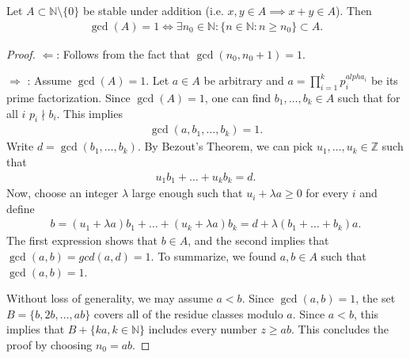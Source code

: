 \begin{lemma}
	Let $A \subset \mathbb{N}\setminus \{0\}$ be stable under addition (i.e. $x,y\in A \implies x+y \in A$). Then
	\begin{align}
		\gcd (A) = 1 \iff \exists n_0 \in \mathbb{N}: \{n \in \mathbb{N}: n \geq n_0 \} \subset A.	
	\end{align}
\end{lemma}
\begin{proof}
	$\Longleftarrow$: Follows from the fact that $\gcd(n_0, n_0+1)=1$.

	$\Longrightarrow$ : Assume $\gcd(A)=1$. Let $a \in A$ be arbitrary and  $a =  \prod_{i=1}^{k}p_{i}^{alpha_i}$ be its prime factorization. Since $\gcd(A)=1$, one can find $b_1, \ldots, b_k \in A$ such that for all $i$ $p_i \nmid b_i$. This implies
	\begin{align}
		\gcd(a,b_1,\ldots, b_k)=1.
	\end{align}
	Write $d=\gcd(b_1,\ldots, b_k)$. By Bezout's Theorem, we can pick $u_1,\ldots,u_k \in \mathbb{Z}$ such that
	\begin{align}
		u_1b_1 + \ldots + u_k b_k = d.
	\end{align}
	Now, choose an integer $\lambda $ large enough such that $u_i + \lambda a \geq 0$ for every $i$ and define
	\begin{align}
		b = (u_1 + \lambda a)b_1 + \ldots + (u_k + \lambda a)b_k = d + \lambda (b_1 + \ldots + b_k) a.
	\end{align}
	The first expression shows that $b\in A$, and the second implies that $\gcd(a,b) = gcd(a,d)=1$. To summarize, we found $a,b \in A$ such that $\gcd(a,b)=1$.

	Without loss of generality, we may assume $a<b$. Since $\gcd(a,b)=1$, the set $B=\{b, 2b, \ldots, ab\}$ covers all of the residue classes modulo $a$. Since $a<b$, this implies that $B+\{ka,  k \in \mathbb{N}\}$ includes every number $z\geq ab$. This concludes the proof by choosing $n_0 = ab$.
\end{proof}
